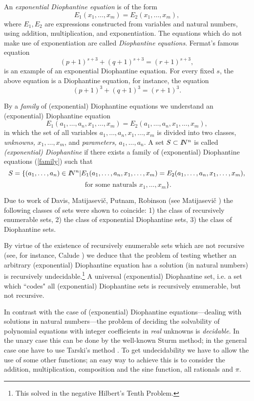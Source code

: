 An {\it exponential Diophantine equation} is of the form
\[E_1(x_1,\ldots ,x_m) = E_2(x_1,\ldots ,x_m),\]
where $E_1, E_2$ are expressions constructed from variables and natural
numbers,  using
addition, multiplication, and exponentiation. The equations which do not
make use of
exponentiation are called  {\it Diophantine equations}. Fermat's famous
equation
\[(p+1)^{s+3} + (q+1)^{s+3} = (r+1)^{s+3},\]
is an example of an exponential Diophantine equation. For every fixed $s$,
the above
equation is  a Diophantine equation, for instance, the equation
\[(p+1)^{3} + (q+1)^{3} = (r+1)^{3}.\]

By a {\it family} of (exponential) Diophantine equations we understand an
(exponential)
Diophantine equation
\begin{equation}
\label{family}
E_1(a_1, \ldots , a_n,x_1,\ldots ,x_m) = E_2(a_1, \ldots , a_n,x_1,\ldots ,x_m),
\end{equation}
in which the set of all variables $a_1, \ldots , a_n,x_1,\ldots ,x_m$ is
divided into two classes,
{\it unknowns,} $x_1,\ldots ,x_m$, and {\it parameters,} $a_1, \ldots , a_n$.
A set $S \subset I\!\!N^n$ is called  {\it (exponential) Diophantine} if there
exists a
family of (exponential) Diophantine  equations (\ref{family}) such that
\[S = \{(a_1, \ldots , a_n) \in I\!\!N^{n}|
E_1(a_1, \ldots , a_n,x_1,\ldots ,x_m) = E_2(a_1, \ldots , a_n,x_1,\ldots
,x_m),\]
\[\mbox{   for some naturals   }
x_1,\ldots ,x_m\}.\]

 Due to work of  Davis, Matijasevi\v{c}, Putnam, Robinson  (see
Matijasevi\v{c} \cite{matia})
the following classes of sets were shown to coincide:
1) the class of recursively enumerable sets,
2) the class of exponential Diophantine sets,
3) the class of  Diophantine sets.

By virtue of the existence of recursively enumerable sets which are not
recursive (see, for instance,
Calude \cite{ca1}) we deduce that the problem of testing whether an
arbitrary (exponential)
Diophantine equation has a solution (in natural numbers) is recursively
undecidable.\footnote{This
solved in the negative Hilbert's Tenth Problem.}
A universal (exponential) Diophantine set, i.e. a set which ``codes" all
(exponential) Diophantine sets is recursively enumerable, but not recursive.

In contrast with the case of (exponential) Diophantine equations---dealing
with solutions
in natural numbers---the problem of deciding the solvability of polynomial
equations  with integer coefficients in {\it real} unknowns is {\it
decidable}. In the unary
case this can be done by the well-known Sturm method; in the  general case
one have to use
Tarski's method \cite{tarski}. To get undecidability  we have to allow the use
of some other functions; an easy way to achieve this is to consider the
addition, multiplication,
composition and the sine  function, all rationals and $\pi$.



